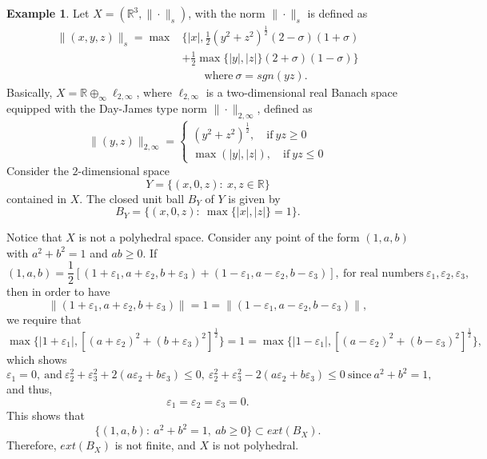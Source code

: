 \documentclass{amsart}
\theoremstyle{definition}
\newtheorem{example}[theorem]{Example}
\theoremstyle{remark}
\numberwithin{equation}{section}
\begin{document}
\begin{example}\label{nonexample: nonpolyhedral}
Let $X=(\mathbb{R}^3,\|\cdot\|_s)$, with the norm $\|\cdot\|_s$ is defined as \begin{align*}
\|(x,y,z)\|_s = \max & \{|x|,\frac{1}{2}(y^2+z^2)^\frac{1}{2}(2-\sigma)(1+\sigma)\\
& +  \frac{1}{2}\max\{|y|,|z|\}(2+\sigma)(1-\sigma)\}\\& \qquad \text{where}~\sigma=sgn(yz).
\end{align*}
\noindent Basically, $X=\mathbb{R}\oplus_\infty \ell_{2,\infty}$, where $\ell_{2,\infty}$ is a two-dimensional real Banach space equipped with the Day-James type norm \cite{NS06} $\|\cdot\|_{2,\infty}$, defined as
\[
\|(y,z)\|_{2,\infty}=\begin{cases}(y^2+z^2)^\frac{1}{2}, \quad \text{if}~yz\geq 0\\\max(|y|,|z|), \quad \text{if}~yz\leq 0\end{cases}
\]
Consider the $2$-dimensional space \[Y=\{(x,0,z):~x,z\in \mathbb{R}\}\]contained in $X$. The closed unit ball $B_Y$ of $Y$ is given by \[B_Y=\{(x,0,z):~\max\{|x|,|z|\}=1\}.\]


\noindent Notice that $X$ is not a polyhedral space. Consider any point of the form $(1,a,b)$ with $a^2+b^2=1$ and $ab\geq 0$. If 
\[
(1,a,b)=\frac{1}{2}[(1+\varepsilon_1, a+\varepsilon_2, b+\varepsilon_3)+(1-\varepsilon_1, a-\varepsilon_2, b-\varepsilon_3)], ~\text{for real numbers}~ \varepsilon_1, \varepsilon_2,\varepsilon_3,
\]
then in order to have
\[
\|(1+\varepsilon_1, a+\varepsilon_2, b+\varepsilon_3)\|=1=\|(1-\varepsilon_1, a-\varepsilon_2, b-\varepsilon_3)\|,
\]
we require that
\[
\max\{|1+\varepsilon_1|,[(a+\varepsilon_2)^2+(b+\varepsilon_3)^2]^\frac{1}{2}\}=1=\max\{|1-\varepsilon_1|,[(a-\varepsilon_2)^2+(b-\varepsilon_3)^2]^\frac{1}{2}\},
\]
which shows
\[
\varepsilon_1=0,~\text{and}~\varepsilon_2^2+\varepsilon_3^2 + 2 (a \varepsilon_2 + b \varepsilon_3)\leq 0,~\varepsilon_2^2+\varepsilon_3^2- 2 (a \varepsilon_2 + b \varepsilon_3)\leq 0~\text{since}~a^2+b^2=1,
\]
and thus,
\[
\varepsilon_1=\varepsilon_2=\varepsilon_3=0.\]This shows that\[\{(1,a,b):~a^2+b^2=1,~ab\geq 0\}\subset ext(B_X).
\]
Therefore, $ext(B_X)$ is not finite, and $X$ is not polyhedral.



\end{example}
\end{document}
